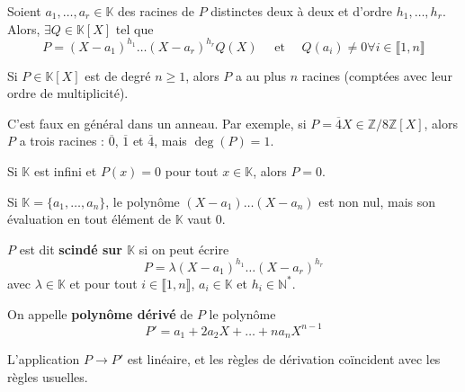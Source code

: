   \begin{proposition}
    Soient $a_1, \dots, a_r \in \mathbb{K}$ des racines de $P$ distinctes deux à deux et d'ordre $h_1, \dots, h_r$. Alors, $\exists Q \in \mathbb{K}[X]$ tel que
    \[ P = (X-a_1)^{h_1} \dots (X-a_r)^{h_r} Q(X) \quad \text{ et } \quad Q(a_i) \neq 0 \forall i \in \llbracket 1, n \rrbracket \]
  \end{proposition}

  \begin{corollary}
    Si $P \in \mathbb{K}[X]$ est de degré $n \geq 1$, alors $P$ a au plus $n$ racines (comptées avec leur ordre de multiplicité).
  \end{corollary}

  \begin{cexample}
    C'est faux en général dans un anneau. Par exemple, si $P = \overline{4}X \in \mathbb{Z}/8\mathbb{Z}[X]$, alors $P$ a trois racines : $\overline{0}$, $\overline{1}$ et $\overline{4}$, mais $\deg(P) = 1$.
  \end{cexample}

  \begin{proposition}
    Si $\mathbb{K}$ est infini et $P(x) = 0$ pour tout $x \in \mathbb{K}$, alors $P = 0$.
  \end{proposition}

  \begin{cexample}
    Si $\mathbb{K} = \{ a_1, \dots, a_n \}$, le polynôme $(X-a_1) \dots (X-a_n)$ est non nul, mais son évaluation en tout élément de $\mathbb{K}$ vaut $0$.
  \end{cexample}

  \begin{definition}
    $P$ est dit \textbf{scindé sur $\mathbb{K}$} si on peut écrire
    \[ P = \lambda (X-a_1)^{h_1} \dots (X-a_r)^{h_r} \]
    avec $\lambda \in \mathbb{K}$ et pour tout $i \in \llbracket 1, n \rrbracket$, $a_i \in \mathbb{K}$ et $h_i \in \mathbb{N}^*$.
  \end{definition}

  \begin{definition}
    On appelle \textbf{polynôme dérivé} de $P$ le polynôme
    \[ P' = a_1 + 2a_2 X + \dots + na_n X^{n-1} \]
  \end{definition}

  \begin{remark}
    L'application $P \rightarrow P'$ est linéaire, et les règles de dérivation coïncident avec les règles usuelles.
  \end{remark}

